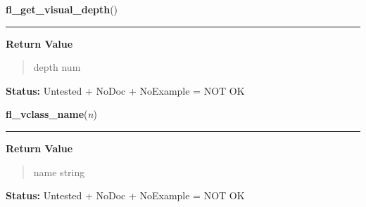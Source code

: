    \label{xformslib:library:fl_get_visual_depth}

    \vspace{0.5ex}

\hspace{.8\funcindent}\begin{boxedminipage}{\funcwidth}

    \raggedright \textbf{fl\_get\_visual\_depth}()

    \vspace{-1.5ex}

    \rule{\textwidth}{0.5\fboxrule}
\setlength{\parskip}{2ex}
\setlength{\parskip}{1ex}
      \textbf{Return Value}
    \vspace{-1ex}

      \begin{quote}
      depth num

      \end{quote}

\textbf{Status:} Untested + NoDoc + NoExample = NOT OK



    \end{boxedminipage}

    \label{xformslib:library:fl_vclass_name}

    \vspace{0.5ex}

\hspace{.8\funcindent}\begin{boxedminipage}{\funcwidth}

    \raggedright \textbf{fl\_vclass\_name}(\textit{n})

    \vspace{-1.5ex}

    \rule{\textwidth}{0.5\fboxrule}
\setlength{\parskip}{2ex}
\setlength{\parskip}{1ex}
      \textbf{Return Value}
    \vspace{-1ex}

      \begin{quote}
      name string

      \end{quote}

\textbf{Status:} Untested + NoDoc + NoExample = NOT OK



    \end{boxedminipage}

